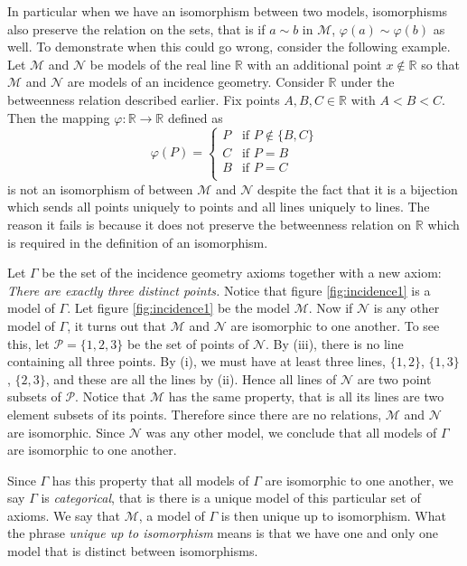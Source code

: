 \documentclass[12pt]{book}
\def\R{{\mathbb{R}}}
\def\cM{{\mathcal{M}}}
\def\cN{{\mathcal{N}}}
\def\cP{{\mathcal{P}}}
\begin{document}
	In particular when we have an isomorphism between two models, isomorphisms also preserve the relation on the sets, that is if $a\sim b$ in $\cM$, $\varphi(a)\sim\varphi(b)$ as well. To demonstrate when this could go wrong, consider the following example. Let $\cM$ and $\cN$ be models of the real line $\R$ with an additional point $x\notin\R$ so that $\cM$ and $\cN$ are models of an incidence geometry. Consider $\R$ under the betweenness relation described earlier. Fix points $A,B,C\in\R$ with $A<B<C$. Then the mapping $\varphi\colon\R\rightarrow\R$ defined as
	\[\varphi(P)=\begin{cases}
	P & \text{if } P\notin\{B,C\}\\
	C & \text{if } P=B\\
	B & \text{if } P=C\\
	\end{cases}\]  
is not an isomorphism of between $\cM$ and $\cN$ despite the fact that it is a bijection which sends all points uniquely to points and all lines uniquely to lines. The reason it fails is because it does not preserve the betweenness relation on $\R$ which is required in the definition of an isomorphism. 

	Let $\Gamma$ be the set of the incidence geometry axioms together with a new axiom: \textit{There are exactly three distinct points.} Notice that figure \ref{fig:incidence1} is a model of $\Gamma$. Let figure \ref{fig:incidence1} be the model $\cM$. Now if $\cN$ is any other model of $\Gamma$, it turns out that $\cM$ and $\cN$ are isomorphic to one another. To see this, let $\cP=\{1,2,3\}$ be the set of points of $\cN$. By (iii), there is no line containing all three points. By (i), we must have at least three lines, $\{1,2\}$, $\{1,3\}$, $\{2,3\}$, and these are all the lines by (ii). Hence all lines of $\cN$ are two point subsets of $\cP$. Notice that $\cM$ has the same property, that is all its lines are two element subsets of its points. Therefore since there are no relations, $\cM$ and $\cN$ are isomorphic. Since $\cN$ was any other model, we conclude that all models of $\Gamma$ are isomorphic to one another. 
	
	Since $\Gamma$ has this property that all models of $\Gamma$ are isomorphic to one another, we say $\Gamma$ is \textit{categorical}, that is there is a unique model of this particular set of axioms. We say that $\cM$, a model of $\Gamma$ is then unique up to isomorphism. What the phrase \textit{unique up to isomorphism} means is that we have one and only one model that is distinct between isomorphisms. 
	
\end{document}
